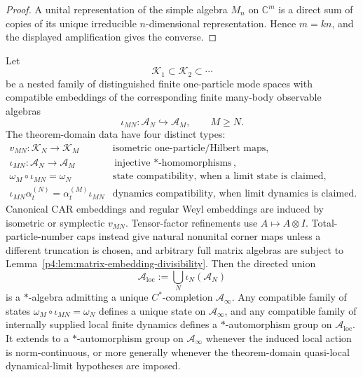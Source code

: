 \documentclass[12pt,a4paper]{article}
\begin{document}
\begin{proof}
A unital representation of the simple algebra \(M_n\) on
\(\mathbb C^m\) is a direct sum of copies of its unique irreducible
\(n\)-dimensional representation.  Hence \(m=kn\), and the displayed
amplification gives the converse.
\end{proof}


\begin{theorem}
\label{p4:thm:inductive-qft-bridge}
Let
\[
\mathcal K_1\subset \mathcal K_2\subset \cdots
\]
be a nested family of distinguished finite one-particle mode spaces with compatible embeddings of the corresponding finite many-body observable algebras
\[
\iota_{MN}:\mathcal A_N\hookrightarrow \mathcal A_M,
\qquad
M\ge N.
\]
The theorem-domain data have four distinct types:
\[
\begin{array}{c|l}
v_{MN}:\mathcal K_N\to\mathcal K_M&
\text{isometric one-particle/Hilbert maps},\\
\iota_{MN}:\mathcal A_N\to\mathcal A_M&
\text{injective \(*\)-homomorphisms},\\
\omega_M\circ\iota_{MN}=\omega_N&
\text{state compatibility, when a limit state is claimed},\\
\iota_{MN}\alpha_t^{(N)}
=\alpha_t^{(M)}\iota_{MN}&
\text{dynamics compatibility, when limit dynamics is claimed}.
\end{array}
\]
Canonical CAR embeddings and regular Weyl embeddings are induced by
isometric or symplectic \(v_{MN}\).  Tensor-factor refinements use
\(A\mapsto A\otimes I\).  Total-particle-number caps instead give natural
nonunital corner maps unless a different truncation is chosen, and arbitrary
full matrix algebras are subject to
Lemma~\ref{p4:lem:matrix-embedding-divisibility}.
Then the directed union
\[
\mathcal A_{\mathrm{loc}}:=\bigcup_N \iota_N(\mathcal A_N)
\]
is a $*$-algebra admitting a unique $C^*$-completion \(\mathcal A_\infty\).
Any compatible family of states \(\omega_M\circ \iota_{MN}=\omega_N\) defines a unique state on \(\mathcal A_\infty\), and any compatible family of internally supplied local finite dynamics defines a \(*\)-automorphism group on \(\mathcal A_{\mathrm{loc}}\).  It extends to a \(*\)-automorphism group on \(\mathcal A_\infty\) whenever the induced local action is norm-continuous, or more generally whenever the theorem-domain quasi-local dynamical-limit hypotheses are imposed.
\end{theorem}
\end{document}
